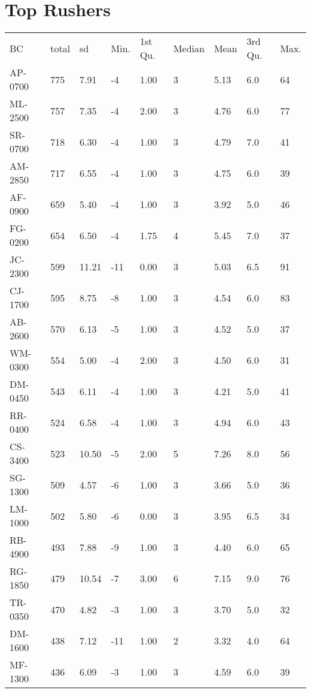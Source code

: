 \documentclass{exam}
\begin{document}

  \section{Top Rushers}
  \begin{table}[H]
    \centering
    \begin{tabular}{lllllllll}
      \toprule
      \midrule
      BC      & total & sd    & Min. & 1st Qu. & Median & Mean & 3rd Qu. & Max. \\
      AP-0700 & 775   & 7.91  & -4   & 1.00    & 3      & 5.13 & 6.0     & 64 \\
      ML-2500 & 757   & 7.35  & -4   & 2.00    & 3      & 4.76 & 6.0     & 77 \\
      SR-0700 & 718   & 6.30  & -4   & 1.00    & 3      & 4.79 & 7.0     & 41 \\
      AM-2850 & 717   & 6.55  & -4   & 1.00    & 3      & 4.75 & 6.0     & 39 \\
      AF-0900 & 659   & 5.40  & -4   & 1.00    & 3      & 3.92 & 5.0     & 46 \\
      FG-0200 & 654   & 6.50  & -4   & 1.75    & 4      & 5.45 & 7.0     & 37 \\
      JC-2300 & 599   & 11.21 & -11  & 0.00    & 3      & 5.03 & 6.5     & 91 \\
      CJ-1700 & 595   & 8.75  & -8   & 1.00    & 3      & 4.54 & 6.0     & 83 \\
      AB-2600 & 570   & 6.13  & -5   & 1.00    & 3      & 4.52 & 5.0     & 37 \\
      WM-0300 & 554   & 5.00  & -4   & 2.00    & 3      & 4.50 & 6.0     & 31 \\
      DM-0450 & 543   & 6.11  & -4   & 1.00    & 3      & 4.21 & 5.0     & 41 \\
      RR-0400 & 524   & 6.58  & -4   & 1.00    & 3      & 4.94 & 6.0     & 43 \\
      CS-3400 & 523   & 10.50 & -5   & 2.00    & 5      & 7.26 & 8.0     & 56 \\
      SG-1300 & 509   & 4.57  & -6   & 1.00    & 3      & 3.66 & 5.0     & 36 \\
      LM-1000 & 502   & 5.80  & -6   & 0.00    & 3      & 3.95 & 6.5     & 34 \\
      RB-4900 & 493   & 7.88  & -9   & 1.00    & 3      & 4.40 & 6.0     & 65 \\
      RG-1850 & 479   & 10.54 & -7   & 3.00    & 6      & 7.15 & 9.0     & 76 \\
      TR-0350 & 470   & 4.82  & -3   & 1.00    & 3      & 3.70 & 5.0     & 32 \\
      DM-1600 & 438   & 7.12  & -11  & 1.00    & 2      & 3.32 & 4.0     & 64 \\
      MF-1300 & 436   & 6.09  & -3   & 1.00    & 3      & 4.59 & 6.0     & 39 \\
      \bottomrule
    \end{tabular}
  \end{table}
\end{document}
